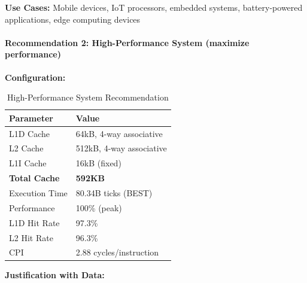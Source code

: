 \documentclass[11pt,a4paper]{article}
\begin{document}
\textbf{Use Cases:} Mobile devices, IoT processors, embedded systems, battery-powered applications, edge computing devices

\paragraph{Recommendation 2: High-Performance System (maximize performance)}

\textbf{Configuration:}

\begin{table}[H]
\centering
\caption{High-Performance System Recommendation}
\begin{tabular}{ll}
\toprule
\textbf{Parameter} & \textbf{Value} \\
\midrule
L1D Cache & 64kB, 4-way associative \\
L2 Cache & 512kB, 4-way associative \\
L1I Cache & 16kB (fixed) \\
\textbf{Total Cache} & \textbf{592KB} \\
\midrule
Execution Time & 80.34B ticks (BEST) \\
Performance & 100\% (peak) \\
L1D Hit Rate & 97.3\% \\
L2 Hit Rate & 96.3\% \\
CPI & 2.88 cycles/instruction \\
\bottomrule
\end{tabular}
\end{table}

\textbf{Justification with Data:}
\end{document}
